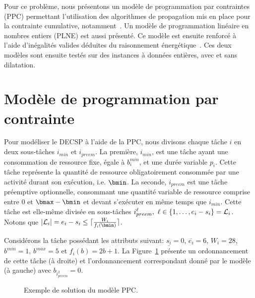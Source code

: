 Pour ce problème, nous présentons un modèle de
programmation par contraintes (PPC) permettant l'utilisation des
algorithmes de propagation mis en place pour la contrainte
cumulative, notamment~\cite{Gay2015}.  Un modèle de
programmation linéaire en nombres entiers (PLNE) est aussi
présenté. Ce modèle est ensuite renforcé à l'aide d'inégalités
valides déduites du raisonnement énergétique~\cite{Lopez1990}. 
Ces deux modèles sont ensuite testés sur des instances à données
entières, avec et sans dilatation.

\section{Modèle de programmation par contrainte}

Pour modéliser le DECSP à l'aide de la PPC, nous divisons chaque tâche
$i$ en deux sous-tâches $i_{min}$ et $i_{preem}$. La première,
$i_{min}$, est une tâche ayant une consommation de ressource fixe,
égale à $b_i^{min}$, et une durée variable $p_i$. Cette tâche
représente la quantité de ressource obligatoirement consommée par une
activité durant son exécution, i.e. $\bmin$.  La seconde, $i_{preem}$
est une tâche préemptive optionnelle, consommant une quantité variable
de ressource comprise entre $0$ et $\bmax-\bmin$ et devant s'exécuter
en même temps que $i_{min}$. Cette tâche est elle-même divisée en
sous-tâches $i_{preem}^\ell,\ \ell \in \{1,\dots, e_i-s_i\}={\cal L}_i$. Notons
que $|{\cal L}_i|=e_i - s_i \le \lceil \frac{W_i}{f_i(\bmin)}\rceil$. 
\begin{ex}
Considérons la tâche possédant les attributs suivant:  $\underline{s_i}= 0$,
$\overline{e_i}=6$, $W_i=28$, $b^{min}=1$,
$b^{max}=5$ et $f_i(b)=2b+1$. La Figure~\ref{fig:ex:PPC} présente un
ordonnancement de cette tâche (à droite) et l'ordonnancement
correspondant donné par le modèle (à gauche) avec $b_{i^2_{preem}}=0$. 
\begin{figure}[!htb]
  \centering
  \caption{Exemple de solution du modèle PPC.}
  \label{fig:ex:PPC}
\end{figure}
\end{ex}
